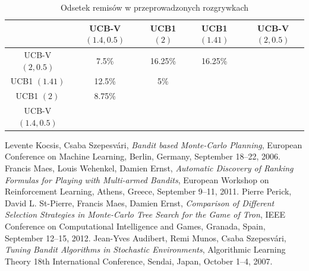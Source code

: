 \documentclass[a4paper,12pt]{article}
\begin{document}
\begin{table}[!h]
	\centering
	\begin{tabular}{|c|c|c|c|c|} \hline
		& UCB-V $(1.4, 0.5)$ & UCB1 $(2)$ & UCB1 $(1.41)$ & UCB-V $(2, 0.5)$ \\ \hline
		UCB-V $(2, 0.5)$ & 7.5\% & 16.25\% & 16.25\% & \cellcolor{lightgray} \\ \hline
		UCB1 $(1.41)$ & 12.5\% & 5\% & \cellcolor{lightgray} & \cellcolor{lightgray} \\ \hline
		UCB1 $(2)$ & 8.75\% & \cellcolor{lightgray} & \cellcolor{lightgray} & \cellcolor{lightgray}  \\ \hline
		UCB-V $(1.4, 0.5)$ & \cellcolor{lightgray} & \cellcolor{lightgray} & \cellcolor{lightgray} & \cellcolor{lightgray} \\ \hline
	\end{tabular}
	\caption{Odsetek remisów w przeprowadzonych rozgrywkach}
	\label{tab:draw_count}
\end{table}

\begin{thebibliography}{20}
	 Levente Kocsis, Csaba Szepesvári, \emph{Bandit based Monte-Carlo Planning}, European Conference on Machine Learning, Berlin, Germany, September 18--22, 2006.
	 Francis Maes, Louis Wehenkel, Damien Ernst, \emph{Automatic Discovery of Ranking Formulas for Playing with Multi-armed Bandits}, European Workshop on Reinforcement Learning, Athens, Greece, September 9--11, 2011.
	 Pierre Perick, David L. St-Pierre, Francis Maes, Damien Ernst, \emph{Comparison of Different Selection Strategies in Monte-Carlo Tree Search for the Game of Tron},  IEEE Conference on Computational Intelligence and Games, Granada, Spain, September 12--15, 2012. %
	 Jean-Yves Audibert, Remi Munos, Csaba Szepesvári, \emph{Tuning Bandit Algorithms in Stochastic Environments}, Algorithmic Learning Theory 18th International Conference, Sendai, Japan, October 1--4, 2007. %
\end{thebibliography}
\end{document}
